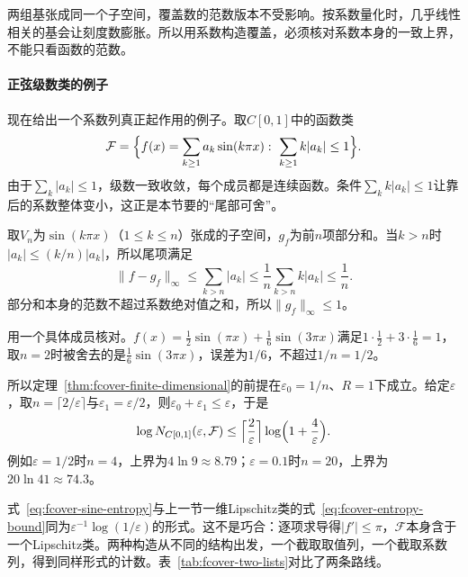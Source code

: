 两组基张成同一个子空间，覆盖数的范数版本不受影响。按系数量化时，几乎线性相关的基会让刻度数膨胀。所以用系数构造覆盖，必须核对系数本身的一致上界，不能只看函数的范数。

\paragraph{正弦级数类的例子}

现在给出一个系数列真正起作用的例子。取$C[0,1]$中的函数类
\begin{equation}
 \mathcal F=\Bigl\{f(x)=\sum_{k\geq1}a_k\sin(k\pi x):\ \sum_{k\geq1}k\lvert a_k\rvert\leq1\Bigr\}.
 \label{eq:fcover-sine-class}
\end{equation}
由于$\sum_k\lvert a_k\rvert\leq1$，级数一致收敛，每个成员都是连续函数。条件$\sum_kk\lvert a_k\rvert\leq1$让靠后的系数整体变小，这正是本节要的“尾部可舍”。

取$V_n$为$\sin(k\pi x)$（$1\leq k\leq n$）张成的子空间，$g_f$为前$n$项部分和。当$k>n$时$\lvert a_k\rvert\leq(k/n)\lvert a_k\rvert$，所以尾项满足
\[
 \lVert f-g_f\rVert_\infty\leq\sum_{k>n}\lvert a_k\rvert\leq\frac1n\sum_{k>n}k\lvert a_k\rvert\leq\frac1n .
\]
部分和本身的范数不超过系数绝对值之和，所以$\lVert g_f\rVert_\infty\leq1$。

用一个具体成员核对。$f(x)=\tfrac12\sin(\pi x)+\tfrac16\sin(3\pi x)$满足$1\cdot\tfrac12+3\cdot\tfrac16=1$，取$n=2$时被舍去的是$\tfrac16\sin(3\pi x)$，误差为$1/6$，不超过$1/n=1/2$。

所以定理~\ref{thm:fcover-finite-dimensional}的前提在$\varepsilon_0=1/n$、$R=1$下成立。给定$\varepsilon$，取$n=\lceil2/\varepsilon\rceil$与$\varepsilon_1=\varepsilon/2$，则$\varepsilon_0+\varepsilon_1\leq\varepsilon$，于是
\begin{equation}
 \log N_{C[0,1]}(\varepsilon,\mathcal F)\leq\Bigl\lceil\frac2\varepsilon\Bigr\rceil\log\Bigl(1+\frac4\varepsilon\Bigr).
 \label{eq:fcover-sine-entropy}
\end{equation}
例如$\varepsilon=1/2$时$n=4$，上界为$4\ln9\approx8.79$；$\varepsilon=0.1$时$n=20$，上界为$20\ln41\approx74.3$。

式~\eqref{eq:fcover-sine-entropy}与上一节一维Lipschitz类的式~\eqref{eq:fcover-entropy-bound}同为$\varepsilon^{-1}\log(1/\varepsilon)$的形式。这不是巧合：逐项求导得$\lvert f'\rvert\leq\pi$，$\mathcal F$本身含于一个Lipschitz类。两种构造从不同的结构出发，一个截取取值列，一个截取系数列，得到同样形式的计数。表~\ref{tab:fcover-two-lists}对比了两条路线。


